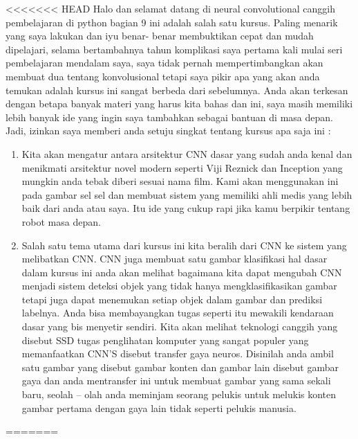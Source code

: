 <<<<<<< HEAD
Halo dan selamat datang di neural convolutional canggih pembelajaran di python bagian 9 ini adalah salah satu kursus. Paling menarik yang saya lakukan dan iyu benar- benar membuktikan cepat dan mudah dipelajari, selama bertambahnya tahun komplikasi saya pertama kali mulai seri pembelajaran mendalam saya, saya tidak pernah mempertimbangkan akan membuat dua tentang konvolusional tetapi saya pikir apa yang akan anda temukan adalah kursus ini sangat berbeda dari sebelumnya. Anda akan terkesan dengan betapa banyak materi yang harus kita bahas dan ini, saya masih memiliki lebih banyak ide yang ingin saya tambahkan sebagai bantuan di masa depan.
Jadi, izinkan saya memberi anda setuju singkat tentang kursus apa saja ini	:
\begin{enumerate}
\item Kita akan mengatur antara arsitektur CNN dasar yang sudah anda kenal dan menikmati arsitektur novel modern seperti Viji Reznick dan Inception yang mungkin anda tebak diberi sesuai nama film. Kami akan menggunakan ini pada gambar sel sel dan membuat sistem yang memiliki ahli medis yang lebih baik dari anda atau saya. Itu ide yang cukup rapi jika kamu berpikir tentang robot masa depan.
\item Salah satu tema utama dari kursus ini kita beralih dari CNN ke sistem yang melibatkan CNN. CNN juga membuat satu gambar klasifikasi hal dasar dalam kursus ini anda akan melihat bagaimana kita dapat mengubah CNN menjadi sistem deteksi objek yang tidak hanya mengklasifikasikan gambar tetapi juga dapat menemukan setiap objek dalam gambar dan prediksi labelnya. Anda bisa membayangkan tugas seperti itu mewakili kendaraan dasar yang bis menyetir sendiri. Kita akan melihat teknologi canggih yang disebut SSD tugas penglihatan komputer yang sangat populer yang memanfaatkan CNN’S disebut transfer gaya neuros. Disinilah anda ambil satu gambar yang disebut gambar konten dan gambar lain disebut gambar gaya dan anda mentransfer ini untuk membuat gambar yang sama sekali baru, seolah – olah anda meminjam seorang pelukis untuk melukis konten gambar pertama dengan gaya lain tidak seperti pelukis manusia.
\end{enumerate}

=======
